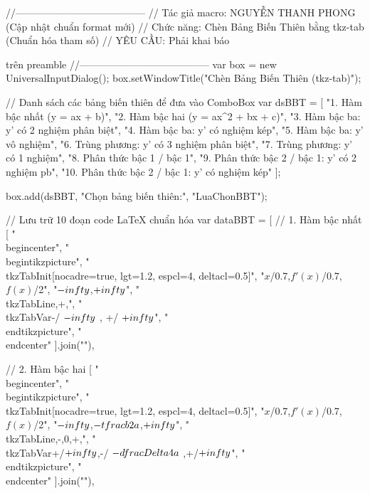 //---------------------------------------
// Tác giả macro: NGUYỄN THANH PHONG (Cập nhật chuẩn format mới)
// Chức năng: Chèn Bảng Biến Thiên bằng tkz-tab (Chuẩn hóa tham số)
// YÊU CẦU: Phải khai báo \usepackage{tkz-tab} trên preamble
//---------------------------------------
var box = new UniversalInputDialog();
box.setWindowTitle("Chèn Bảng Biến Thiên (tkz-tab)");

// Danh sách các bảng biến thiên để đưa vào ComboBox
var dsBBT = [
"1. Hàm bậc nhất (y = ax + b)",
"2. Hàm bậc hai (y = ax^2 + bx + c)",
"3. Hàm bậc ba: y' có 2 nghiệm phân biệt",
"4. Hàm bậc ba: y' có nghiệm kép",
"5. Hàm bậc ba: y' vô nghiệm",
"6. Trùng phương: y' có 3 nghiệm phân biệt",
"7. Trùng phương: y' có 1 nghiệm",
"8. Phân thức bậc 1 / bậc 1",
"9. Phân thức bậc 2 / bậc 1: y' có 2 nghiệm pb",
"10. Phân thức bậc 2 / bậc 1: y' có nghiệm kép"
];

box.add(dsBBT, "Chọn bảng biến thiên:", "LuaChonBBT");

// Lưu trữ 10 đoạn code LaTeX chuẩn hóa
var dataBBT = [
// 1. Hàm bậc nhất
[
"\\begin{center}",
"\\begin{tikzpicture}",
"\\tkzTabInit[nocadre=true, lgt=1.2, espcl=4, deltacl=0.5]",
"{$x$/0.7,$f'(x)$/0.7,$f(x)$/2}",
"{$-\\infty$,$+\\infty$}",
"\\tkzTabLine{,+,}",
"\\tkzTabVar{-/ $-\\infty$ , +/ $+\\infty$}",
"\\end{tikzpicture}",
"\\end{center}"
].join("\n"),

// 2. Hàm bậc hai
[
"\\begin{center}",
"\\begin{tikzpicture}",
"\\tkzTabInit[nocadre=true, lgt=1.2, espcl=4, deltacl=0.5]",
"{$x$/0.7,$f'(x)$/0.7,$f(x)$/2}",
"{$-\\infty$,$-\\tfrac{b}{2a}$,$+\\infty$}",
"\\tkzTabLine{,-,0,+,}",
"\\tkzTabVar{+/$+\\infty$,-/ $-\\dfrac{\\Delta}{4a}$ ,+/$+\\infty$}",
"\\end{tikzpicture}",
"\\end{center}"
].join("\n"),

